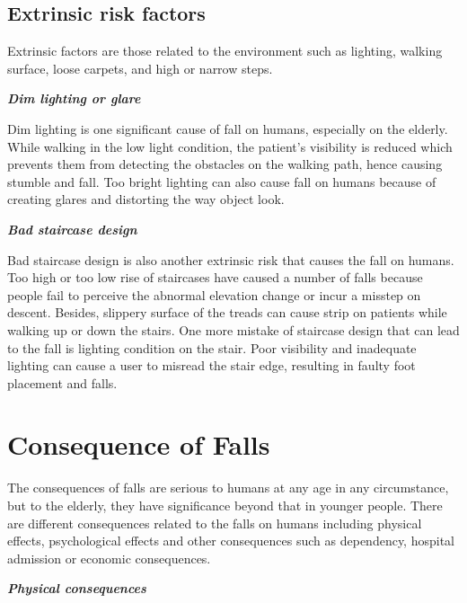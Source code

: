 \documentclass[letterpaper,12pt,titlepage,oneside,final]{book}
\begin{document}
\subsection{Extrinsic risk factors}
Extrinsic factors are those related to the environment such as lighting, walking surface, loose carpets, and high or narrow steps. 

\vspace{0.3cm}
\textbf{\textit{Dim lighting or glare}}\par
Dim lighting is one significant cause of fall on humans, especially on the elderly. While walking in the low light condition, the patient's visibility is reduced which prevents them from detecting the obstacles on the walking path, hence causing stumble and fall. Too bright lighting can also cause fall on humans because of creating glares and distorting the way object look. \par
\vspace{0.3cm}
\textbf{\textit{Bad staircase design}}\par

Bad staircase design is also another extrinsic risk that causes the fall on humans. Too high or too low rise of staircases have caused a number of falls because people fail to perceive the abnormal elevation change or incur a misstep on descent. Besides, slippery surface of the treads can cause strip on patients while walking up or down the stairs. One more mistake of staircase design that can lead to the fall is lighting condition on the stair. Poor visibility and inadequate lighting can cause a user to misread the stair edge, resulting in faulty foot placement and falls.
\section{Consequence of Falls}
The consequences of falls are serious to humans at any age in any circumstance, but to the elderly, they have significance beyond that in younger people. There are different consequences related to the falls on humans including physical effects, psychological effects and other consequences such as dependency, hospital admission or economic consequences. 

\vspace{0.3cm}
\textbf{\textit{Physical consequences}}\par
\end{document}
